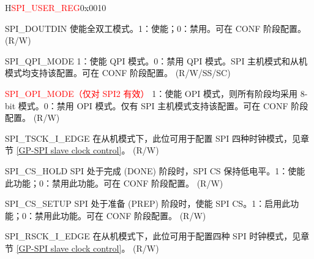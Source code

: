 \begin{register}{H}{\textcolor{red}{SPI\_USER\_REG}}{0x{}0010}\label{regdesc:SPIUSERREG}
%
%
%
%
%
%
%
%
%
%
%
%
%
%
%
%
%
%
%
%
%
%
%
%
%
\regnewline%
\begin{regdesc}\begin{reglist}
\label{fielddesc:SPIDOUTDIN}\item [SPI\_DOUTDIN] 使能全双工模式。1：使能；0：禁用。可在 CONF 阶段配置。 (R/W)
\label{fielddesc:SPIQPIMODE}\item [SPI\_QPI\_MODE] 1：使能 QPI 模式。0：禁用 QPI 模式。SPI 主机模式和从机模式均支持该配置。可在 CONF 阶段配置。 (R/W/SS/SC)
\label{fielddesc:SPIOPIMODE}\item [\textcolor{red}{SPI\_OPI\_MODE（仅对 SPI2 有效）}] 1：使能 OPI 模式，则所有阶段均采用 8-bit 模式。0：禁用 OPI 模式。仅有 SPI 主机模式支持该配置。可在 CONF 阶段配置。 (R/W)
\label{fielddesc:SPITSCKIEDGE}\item [SPI\_TSCK\_I\_EDGE] 在从机模式下，此位可用于配置 SPI 四种时钟模式，见章节 \ref{GP-SPI slave clock control}。 (R/W)
\label{fielddesc:SPICSHOLD}\item [SPI\_CS\_HOLD] SPI 处于完成 (DONE) 阶段时，SPI CS 保持低电平。1：使能此功能；0：禁用此功能。可在 CONF 阶段配置。 (R/W)
\label{fielddesc:SPICSSETUP}\item [SPI\_CS\_SETUP] SPI 处于准备 (PREP) 阶段时，使能 SPI CS。1：启用此功能；0：禁用此功能。可在 CONF 阶段配置。 (R/W)
\label{fielddesc:SPIRSCKIEDGE}\item [SPI\_RSCK\_I\_EDGE] 在从机模式下，此位可用于配置四种 SPI 时钟模式，见章节 \ref{GP-SPI slave clock control}。 (R/W)

\end{reglist}
\end{regdesc}
\end{register}
